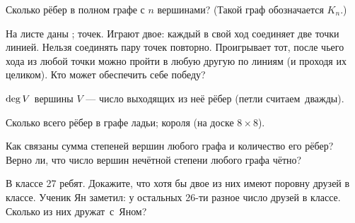 \documentclass[12pt,a4paper]{article}
\begin{document}
Сколько рёбер в полном графе с $n$ вершинами? (Такой граф обозначается $K_n$.)


На листе даны ;  точек. Играют двое: каждый в свой ход соединяет две точки линией. Нельзя соединять пару точек повторно. Проигрывает тот, после чьего хода из любой точки можно пройти в любую другую по линиям (и проходя их целиком). Кто может обеспечить себе победу?


 ${\rm deg}\, V$ вершины $V$  ---  число
выходящих из неё рёбер (петли считаем~дважды).


Сколько всего рёбер в графе  ладьи;  короля (на доске $8\times8$).

\vspace*{-1mm}
Как связаны сумма степеней вершин любого графа
и количество его рёбер?\\
Верно ли, что число вершин нечётной степени любого графа чётно?


В классе 27 ребят.
 Докажите, что хотя бы двое из них имеют поровну друзей в классе.
 Ученик Ян заметил: у остальных 26-ти разное число друзей
в классе. Сколько из них дружат~с~Яном?


\end{document}
